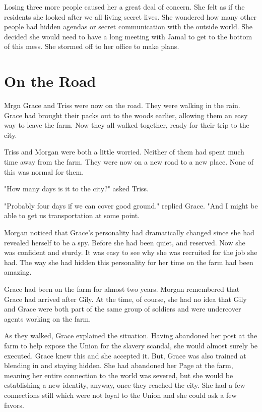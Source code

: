 \documentclass[courier]{sffms}
\begin{document}
Losing three more people caused her a great deal
of concern. She felt as if the residents she looked
after we all living secret lives. She wondered how
many other people had hidden agendas or secret
communication with the outside world. She decided
she would need to have a long meeting with Jamal
to get to the bottom of this mess. She stormed off
to her office to make plans.

\chapter{On the Road}
Mrgn Grace and Triss were now on the road. They
were walking in the rain. Grace had brought their
packs out to the woods earlier, allowing them an 
easy way to leave the farm. Now they all walked
together, ready for their trip to the city.

Triss and Morgan were both a little worried. Neither
of them had spent much time away from the farm.
They were now on a new road to a new place. None
of this was normal for them.

"How many days is it to the city?" asked Triss.

"Probably four days if we can cover good ground."
replied Grace. "And I might be able to get us
transportation at some point.

Morgan noticed that Grace's personality had
dramatically changed since she had revealed
herself to be a spy. Before she had been quiet,
and reserved. Now she was confident and sturdy.
It was easy to see why she was recruited for
the job she had. The way she had hidden this
personality for her time on the farm had been
amazing.

Grace had been on the farm for almost two years.
Morgan remembered that Grace had arrived after
Gily. At the time, of course, she had no idea that
Gily and Grace were both part of the same group
of soldiers and were undercover agents working
on the farm.

As they walked, Grace explained the situation.
Having abandoned her post at the farm to help
expose the Union for the slavery scandal, she
would almost surely be executed. Grace knew
this and she accepted it. But, Grace was also
trained at blending in and staying hidden. She had
abandoned her Page at the farm, meaning her
entire connection to the world was severed, but she
would be establishing a new identity, anyway, once
they reached the city. She had a few connections
still which were not loyal to the Union and she could
ask a few favors.
\end{document}
